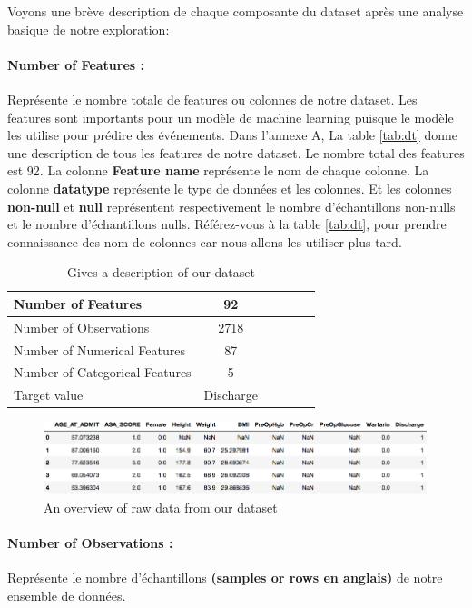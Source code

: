 \documentclass[12pt, french]{report}
\begin{document}
Voyons une brève description de chaque composante du dataset après une analyse basique de notre exploration:

\paragraph*{Number of Features :} Représente le nombre totale de features ou colonnes de notre dataset. Les features sont importants pour un modèle de machine learning puisque le modèle les utilise pour prédire des événements. Dans l'annexe A, La table \ref{tab:dt} donne une description de tous les features de notre dataset. Le nombre total des features est 92.  La colonne \textbf{Feature name} représente le nom de chaque colonne. La colonne \textbf{datatype} représente le type de données et les colonnes. Et les colonnes \textbf{non-null} et \textbf{null} représentent respectivement le nombre d'échantillons non-nulls et le nombre d'échantillons nulls. Référez-vous à la table \ref{tab:dt}, pour prendre connaissance des nom de colonnes car nous allons les utiliser plus tard. 



\begin{table}[h]
\centering
\begin{tabular}{|l|c|c|c|c|c|}
\hline
Number of Features & 92 \\
\hline
Number of Observations & 2718\\
\hline
Number of Numerical Features & 87\\
\hline
Number of Categorical Features & 5\\
\hline
Target value & Discharge\\
\hline

\end{tabular}
\caption{Gives a description of our dataset}
\label{tab:dataset}
\end{table}

\begin{figure}[h]
\includegraphics[width=18cm]{images/examplesfeatures.png}
\caption{An overview of raw data from our dataset}
\label{fig:samplesdataset}
\end{figure}


\paragraph*{Number of Observations :} Représente le nombre d'échantillons \textbf{(samples or rows en anglais)} de notre ensemble de données. 
\end{document}
